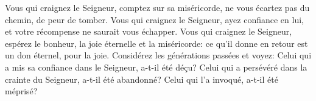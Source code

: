 Vous qui craignez le Seigneur, comptez sur sa miséricorde,
	ne vous écartez pas du chemin, de peur de tomber.
Vous qui craignez le Seigneur, ayez confiance en lui,
	et votre récompense ne saurait vous échapper.
Vous qui craignez le Seigneur, espérez le bonheur, la joie éternelle et la miséricorde:
	ce qu’il donne en retour est un don éternel, pour la joie.
Considérez les générations passées et voyez:
	Celui qui a mis sa confiance dans le Seigneur, a-t-il été déçu?
	Celui qui a persévéré dans la crainte du Seigneur, a-t-il été abandonné?
	Celui qui l’a invoqué, a-t-il été méprisé?
